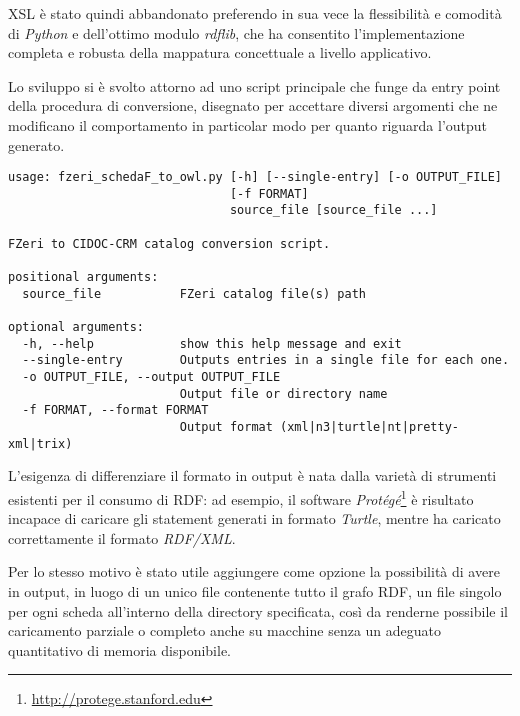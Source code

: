XSL è stato quindi abbandonato preferendo in sua vece la flessibilità e comodità di \emph{Python} e dell'ottimo modulo \emph{rdflib}, che ha consentito l'implementazione completa e robusta della mappatura concettuale a livello applicativo.

Lo sviluppo si è svolto attorno ad uno script principale che funge da entry point della procedura di conversione, disegnato per accettare diversi argomenti che ne modificano il comportamento in particolar modo per quanto riguarda l'output generato.

\begin{noindent}
\begin{minipage}{\linewidth}
\begin{lstlisting}[frame=single,caption=Help in linea di \texttt{fzeri\_schedaF\_to\_owl.py}, label=listing:usage]
usage: fzeri_schedaF_to_owl.py [-h] [--single-entry] [-o OUTPUT_FILE]
                               [-f FORMAT]
                               source_file [source_file ...]

FZeri to CIDOC-CRM catalog conversion script.

positional arguments:
  source_file           FZeri catalog file(s) path

optional arguments:
  -h, --help            show this help message and exit
  --single-entry        Outputs entries in a single file for each one.
  -o OUTPUT_FILE, --output OUTPUT_FILE
                        Output file or directory name
  -f FORMAT, --format FORMAT
                        Output format (xml|n3|turtle|nt|pretty-xml|trix)
\end{lstlisting}
\end{minipage}
\end{noindent}

L'esigenza di differenziare il formato in output è nata dalla varietà di strumenti esistenti per il consumo di RDF: ad esempio, il software \emph{Protégé}\footnote{\url{http://protege.stanford.edu}} è risultato incapace di caricare gli statement generati in formato \emph{Turtle}, mentre ha caricato correttamente il formato \emph{RDF/XML}.

Per lo stesso motivo è stato utile aggiungere come opzione la possibilità di avere in output, in luogo di un unico file contenente tutto il grafo RDF, un file singolo per ogni scheda all'interno della directory specificata, così da renderne possibile il caricamento parziale o completo anche su macchine senza un adeguato quantitativo di memoria disponibile.

